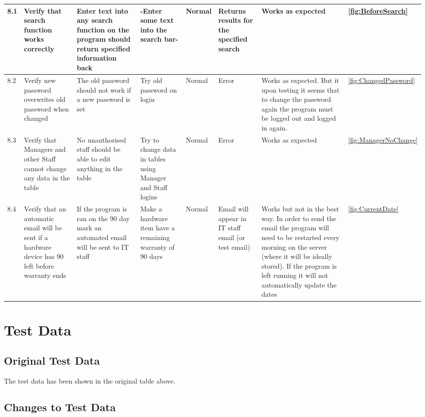 \begin{landscape}
\begin{center}
\begin{longtable}{|p{1.5cm}|p{2cm}|p{2.5cm}|p{2cm}|p{2cm}|p{2cm}|p{3cm}|p{1.7cm}|}
8.1 & Verify that search function works correctly & Enter text into any search function on the program should return specified information back & -Enter some text into the search bar- & Normal & Returns results for the specified search &Works as expected&\ref {fig:BeforeSearch} \\ \hline
8.2 & Verify new password overwrites old password when changed & The old password should not work if a new password is set & Try old password on login & Normal & Error & Works as expected. But it upon testing it seems that to change the password again the program must be logged out and logged in again.&\ref {fig:ChangedPassword} \\ \hline
8.3 & Verify that Managers and other Staff cannot change any data in the table & No unauthorised staff should be able to edit anything in the table & Try to change data in tables using Manager and Staff logins & Normal & Error &Works as expected&\ref {fig:ManagerNoChange} \\ \hline
\rowcolor{lightgray}8.4 & Verify that an automatic email will be sent if a hardware device has 90 left before warranty ends &If the program is ran on the 90 day mark an automated email will be sent to IT staff &Make a hardware item have a remaining warranty of 90 days &Normal&Email will appear in IT staff email (or test email) & Works but not in the best way. In order to send the email the program will need to be restarted every morning on the server (where it will be ideally stored). If the program is left running it will not automatically update the dates &\ref {fig:CurrentDate} \\ \hline



    \end{longtable}
\end{center}

\section{Test Data}

\subsection{Original Test Data}

The test data has been shown in the original table above.

\subsection{Changes to Test Data}


\end{landscape}
